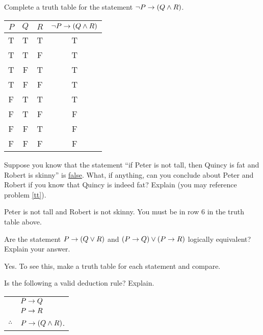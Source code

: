 \begin{questions}

\question\label{tt} Complete a truth table for the statement $\neg P \rightarrow (Q \wedge R)$.

  \begin{answer}
    \begin{tabular}{c|c|c||c}
                     $P$&$Q$&$R$& $\neg P \rightarrow (Q \wedge R)$ \\ \hline
                     T & T & T & T\\
                     T & T & F & T\\
                     T & F & T & T\\
                     T & F & F & T \\
                     F & T & T & T\\
                     F & T & F & F\\
                     F & F & T & F\\
                     F & F & F & F
                    \end{tabular}
  \end{answer}

  
\question Suppose you know that the statement ``if Peter is not tall, then Quincy is fat and Robert is skinny'' is \underline{false}.  What, if anything, can you conclude about Peter and Robert if you know that Quincy is indeed fat?  Explain (you may reference problem \ref{tt}).

  \begin{answer}
    Peter is not tall and Robert is not skinny.  You must be in row 6 in the truth table above.
  \end{answer}


\question Are the statement $P \rightarrow (Q \vee R)$ and $(P \rightarrow Q) \vee (P \rightarrow R)$ logically equivalent?  Explain your answer.

  \begin{answer}
    Yes.  To see this, make a truth table for each statement and compare.
  \end{answer}


  
\question Is the following a valid deduction rule?  Explain.
\begin{center}
 \begin{tabular}{rl} & $P \rightarrow Q$ \\ & $P\rightarrow R$ \\ \hline $\therefore$ & $P \rightarrow (Q \wedge R)$.\end{tabular} 
 \end{center}


\end{questions}
